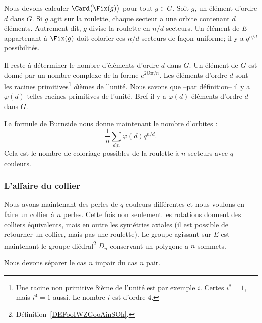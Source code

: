 Nous devons calculer \( \Card\big( \Fix(g) \big)\) pour tout \( g\in G\). Soit \( g\), un élément d'ordre \( d\) dans \( G\). Si \( g\) agit sur la roulette, chaque secteur a une orbite contenant \( d\) éléments. Autrement dit, \( g\) divise la roulette en \( n/d\) secteurs. Un élément de \( E\) appartenant à \( \Fix(g)\) doit colorier ces \( n/d\) secteurs de façon uniforme; il y a \( q^{n/d}\) possibilités.

Il reste à déterminer le nombre d'éléments d'ordre \( d\) dans \( G\). Un élément de \( G\) est donné par un nombre complexe de la forme \(  e^{2ik\pi/n}\). Les éléments d'ordre \( d\) sont les racines primitives\footnote{Une racine non primitive \( 8\)ième de l'unité est par exemple \( i\). Certes \( i^8=1\), mais \( i^4=1\) aussi. Le nombre \( i\) est d'ordre \( 4\).} \( d\)ièmes de l'unité. Nous savons que --par définition-- il y a \( \varphi(d)\) telles racines primitives de l'unité. Bref il y a \( \varphi(d)\) éléments d'ordre \( d\) dans \( G\).

La formule de Burnside nous donne maintenant le nombre d'orbites :
\begin{equation}
    \frac{1}{ n }\sum_{d|n}\varphi(d)q^{n/d}.
\end{equation}
Cela est le nombre de coloriage possibles de la roulette à \( n\) secteurs avec \( q\) couleurs.

\subsubsection{L'affaire du collier}
\label{siOQlG}

Nous avons maintenant des perles de \( q\) couleurs différentes et nous voulons en faire un collier à \( n\) perles. Cette fois non seulement les rotations donnent des colliers équivalents, mais en outre les symétries axiales (il est possible de retourner un collier, mais pas une roulette). Le groupe agissant sur \( E\) est maintenant le groupe diédral\footnote{Définition~\ref{DEFooIWZGooAinSOh}.} \( D_n\) conservant un polygone a \( n\) sommets.

Nous devons séparer le cas \( n\) impair du cas \( n\) pair.

